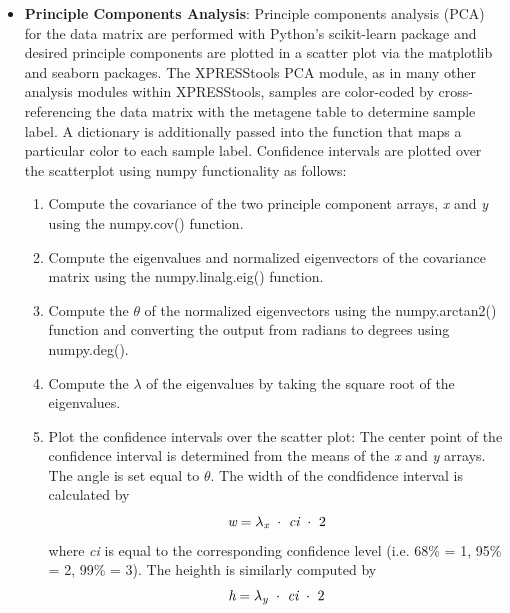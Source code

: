 \documentclass[11pt, a4paper, oneside]{article}
\begin{document}
\begin{itemize}
  \item \textbf{Principle Components Analysis}: Principle components analysis (PCA) for the data matrix are performed with Python's scikit-learn package \cite{scikit_learn} and desired principle components are plotted in a scatter plot via the matplotlib \cite{matplotlib} and seaborn \cite{seaborn} packages. The XPRESStools PCA module, as in many other analysis modules within XPRESStools, samples are color-coded by cross-referencing the data matrix with the metagene table to determine sample label. A dictionary is additionally passed into the function that maps a particular color to each sample label. Confidence intervals are plotted over the scatterplot using numpy \cite{numpy1, numpy2} functionality as follows:

  \begin{enumerate}
    \item Compute the covariance of the two principle component arrays, \textit{x} and \textit{y} using the numpy.cov() function.

    \item Compute the eigenvalues and normalized eigenvectors of the covariance matrix using the numpy.linalg.eig() function.

    \item Compute the $\theta$ of the normalized eigenvectors using the numpy.arctan2() function and converting the output from radians to degrees using numpy.deg().

    \item Compute the $\lambda$ of the eigenvalues by taking the square root of the eigenvalues.

    \item Plot the confidence intervals over the scatter plot: The center point of the confidence interval is determined from the means of the \textit{x} and \textit{y} arrays. The angle is set equal to $\theta$. The width of the condfidence interval is calculated by
    \[
    \textit{w} = \lambda _{\textit{\scriptsize{x}}}\ \cdot\ \textit{ci}\ \cdot\ 2
    \]
    where \textit{ci} is equal to the corresponding confidence level (i.e. 68\% = 1, 95\% = 2, 99\% = 3). The heighth is similarly computed by
    \[
    \textit{h} = \lambda _{\textit{\scriptsize{y}}}\ \cdot\ \textit{ci}\ \cdot\ 2
    \]
  \end{enumerate}


\end{itemize}
\end{document}
